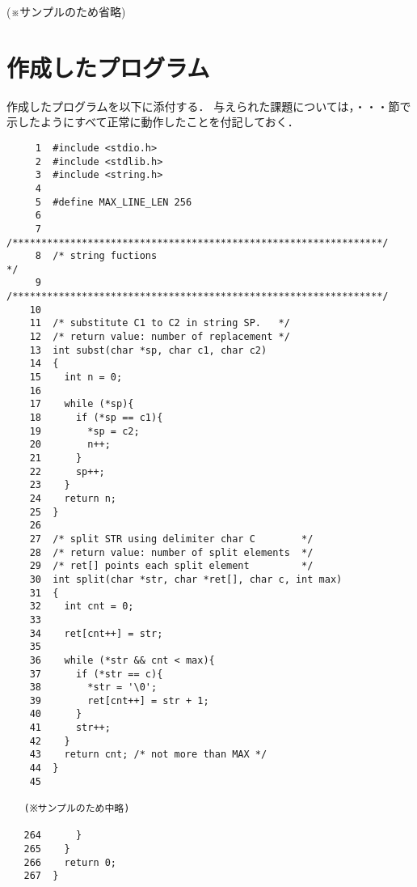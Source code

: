 \documentclass[a4j,11pt]{jarticle}
\begin{document}
(※サンプルのため省略)

\section{作成したプログラム}

作成したプログラムを以下に添付する．
与えられた課題については，・・・節で示したようにすべて正常に動作したことを付記しておく．

%
%
{\fontsize{10pt}{11pt} \selectfont
\begin{verbatim}
     1  #include <stdio.h>
     2  #include <stdlib.h>
     3  #include <string.h>
     4
     5  #define MAX_LINE_LEN 256
     6
     7  /****************************************************************/
     8  /* string fuctions                                              */
     9  /****************************************************************/
    10
    11  /* substitute C1 to C2 in string SP.   */
    12  /* return value: number of replacement */
    13  int subst(char *sp, char c1, char c2)
    14  {
    15    int n = 0;
    16
    17    while (*sp){
    18      if (*sp == c1){
    19        *sp = c2;
    20        n++;
    21      }
    22      sp++;
    23    }
    24    return n;
    25  }
    26
    27  /* split STR using delimiter char C        */
    28  /* return value: number of split elements  */
    29  /* ret[] points each split element         */
    30  int split(char *str, char *ret[], char c, int max)
    31  {
    32    int cnt = 0;
    33
    34    ret[cnt++] = str;
    35
    36    while (*str && cnt < max){
    37      if (*str == c){
    38        *str = '\0';
    39        ret[cnt++] = str + 1;
    40      }
    41      str++;
    42    }
    43    return cnt; /* not more than MAX */
    44  }
    45

   (※サンプルのため中略)

   264      }
   265    }
   266    return 0;
   267  }
\end{verbatim}
}

\end{document}
